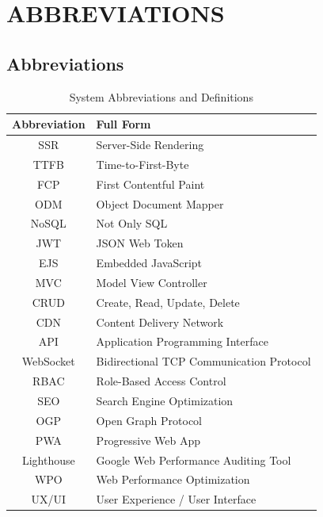 \documentclass[12pt,a4paper]{report}
\begin{document}
\newpage

\chapter*{ABBREVIATIONS}

\section{Abbreviations}


\begin{table}[H]
\centering
\begin{tabular}{|c|p{9cm}|}
\hline
\textbf{Abbreviation} & \textbf{Full Form} \\
\hline
SSR & Server-Side Rendering \\
TTFB & Time-to-First-Byte \\
FCP & First Contentful Paint \\
ODM & Object Document Mapper \\
NoSQL & Not Only SQL \\
JWT & JSON Web Token \\
EJS & Embedded JavaScript \\
MVC & Model View Controller \\
CRUD & Create, Read, Update, Delete \\
CDN & Content Delivery Network \\
API & Application Programming Interface \\
WebSocket & Bidirectional TCP Communication Protocol \\
RBAC & Role-Based Access Control \\
SEO & Search Engine Optimization \\
OGP & Open Graph Protocol \\
PWA & Progressive Web App \\
Lighthouse & Google Web Performance Auditing Tool \\
WPO & Web Performance Optimization \\
UX/UI & User Experience / User Interface \\
\hline
\end{tabular}
\caption{System Abbreviations and Definitions}
\end{table}

\newpage
\end{document}
